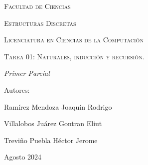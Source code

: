 \documentclass[oneside]{book}
\begin{document}
\begin{titlepage}
        \vspace{1cm}
        {\scshape\Large Facultad de Ciencias \par}
        \vspace{1cm}
        {\scshape\Large Estructuras Discretas \par}
        \vspace{1cm}
        {\scshape\Large Licenciatura en Ciencias de la Computación \par}
        \vspace{1cm}
        {\scshape\Huge Tarea 01: Naturales, inducción y recursión.  \par}
        \vspace{3cm}
        {\itshape\Large Primer Parcial \par}
        \vfill
        {\Large Autores: \par}
        {\Large Ramírez Mendoza Joaquín Rodrigo \par}
        {\Large Villalobos Juárez Gontran Eliut\par}
        {\Large Treviño Puebla Héctor Jerome \par}
        \vfill
        {\Large Agosto 2024 \par}
    \end{titlepage}
    \maketitle

\newpage
\newpage
\newpage
\newpage
\newpage
\newpage
\end{document}

